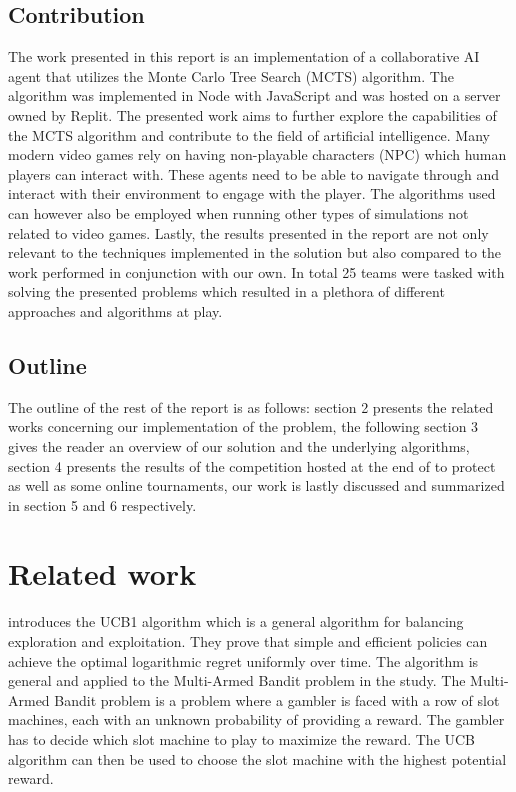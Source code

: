 \documentclass[a4paper,12pt]{article}
\begin{document}
\subsection{Contribution}
The work presented in this report is an implementation of a collaborative AI agent that utilizes the Monte Carlo Tree Search (MCTS) algorithm. The algorithm was implemented in Node with JavaScript and was hosted on a server owned by Replit. The presented work aims to further explore the capabilities of the MCTS algorithm and contribute to the field of artificial intelligence. Many modern video games rely on having non-playable characters (NPC) which human players can interact with. These agents need to be able to navigate through and interact with their environment to engage with the player. The algorithms used can however also be employed when running other types of simulations not related to video games. Lastly, the results presented in the report are not only relevant to the techniques implemented in the solution but also compared to the work performed in conjunction with our own. In total 25 teams were tasked with solving the presented problems which resulted in a plethora of different approaches and algorithms at play. 



\subsection{Outline}
The outline of the rest of the report is as follows: section 2 presents the related works concerning our implementation of the problem, the following section 3 gives the reader an overview of our solution and the underlying algorithms, section 4 presents the results of the competition hosted at the end of to protect as well as some online tournaments, our work is lastly discussed and summarized in section 5 and 6 respectively.


\section{Related work}
\label{sec:relwork}

\cite{AuerPeter2002FAot} introduces the UCB1 algorithm which is a general algorithm for balancing exploration and exploitation. They prove that simple and efficient policies can achieve the optimal logarithmic regret uniformly over time. The algorithm is general and applied to the Multi-Armed Bandit problem in the study. The Multi-Armed Bandit problem is a problem where a gambler is faced with a row of slot machines, each with an unknown probability of providing a reward. The gambler has to decide which slot machine to play to maximize the reward. The UCB algorithm can then be used to choose the slot machine with the highest potential reward. 
\end{document}
